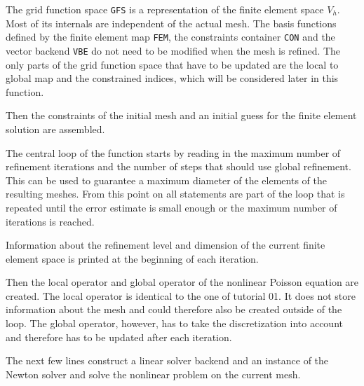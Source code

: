 \documentclass[a4paper,12pt]{article}
\begin{document}

The grid function space \lstinline{GFS} is a representation of the finite element space
$V_h$. Most of its internals are independent of the actual mesh. The basis functions defined
by the finite element map \lstinline{FEM}, the constraints container \lstinline{CON} and the
vector backend \lstinline{VBE} do not need to be modified when the mesh is refined. The only
parts of the grid function space that have to be updated are the local to global map and the
constrained indices, which will be considered later in this function.


Then the constraints of the initial mesh and an initial guess for the finite element solution
are assembled.


The central loop of the function starts by reading in the maximum number of refinement
iterations and the number of steps that should use global refinement. This can be used to
guarantee a maximum diameter of the elements of the resulting meshes. From this point on all
statements are part of the loop that is repeated until the error estimate is small enough
or the maximum number of iterations is reached.


Information about the refinement level and dimension of the current finite element space is
printed at the beginning of each iteration.


Then the local operator and global operator of the nonlinear Poisson equation are created.
The local operator is identical to the one of tutorial 01. It does not store information
about the mesh and could therefore also be created outside of the loop. The global operator,
however, has to take the discretization into account and therefore has to be updated after
each iteration.


The next few lines construct a linear solver backend and an instance of the Newton solver
and solve the nonlinear problem on the current mesh.
\end{document}
